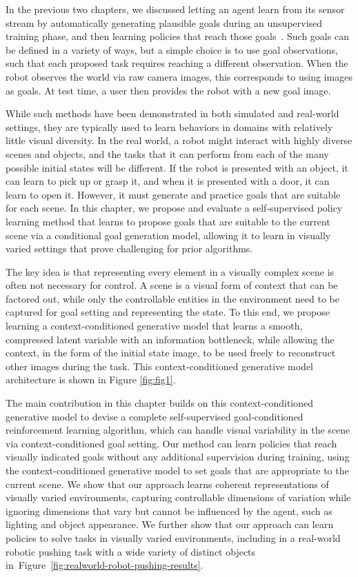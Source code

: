 
In the previous two chapters, we discussed letting an agent learn from its sensor stream by automatically generating plausible goals during an unsupervised training phase, and then learning policies that reach those goals~\citep{nair2018rig, nachum2018hiro, wadefarley2019discern, pong2019skewfit}. Such goals can be defined in a variety of ways, but a simple choice is to use goal observations, such that each proposed task requires reaching a different observation. When the robot observes the world via raw camera images, this corresponds to using images as goals. At test time, a user then provides the robot with a new goal image.

While such methods have been demonstrated in both simulated and real-world settings, they are typically used to learn behaviors in domains with relatively little visual diversity.
In the real world, a robot might interact with highly diverse scenes and objects, and the tasks that it can perform from each of the many possible initial states will be different. If the robot is presented with an object, it can learn to pick up or grasp it, and when it is presented with a door, it can learn to open it. However, it must generate and practice goals that are suitable for each scene. In this chapter, we propose and evaluate a self-supervised policy learning method that learns to propose goals that are suitable to the current scene via a conditional goal generation model, allowing it to learn in visually varied settings that prove challenging for prior algorithms.

The key idea is that representing every element in a visually complex scene is often not necessary for control. A scene is a visual form of context that can be factored out, while only the controllable entities in the environment need to be captured for goal setting and representing the state.
To this end, we propose learning a context-conditioned generative model that learns a smooth, compressed latent variable with an information bottleneck, while allowing the context, in the form of the initial state image, to be used freely to reconstruct other images during the task.
This context-conditioned generative model architecture is shown in Figure \ref{fig:fig1}.

The main contribution in this chapter builds on this context-conditioned generative model to devise a complete self-supervised goal-conditioned reinforcement learning algorithm, which can handle visual variability in the scene via context-conditioned goal setting. Our method can learn policies that reach visually indicated goals without any additional supervision during training, using the context-conditioned generative model to set goals that are appropriate to the current scene. We show that our approach learns coherent representations of visually varied environments, capturing controllable dimensions of variation while ignoring dimensions that vary but cannot be influenced by the agent, such as lighting and object appearance. We further show that our approach can learn policies to solve tasks in visually varied environments, including in a real-world robotic pushing task with a wide variety of distinct objects in~Figure~\ref{fig:realworld-robot-pushing-results}.

